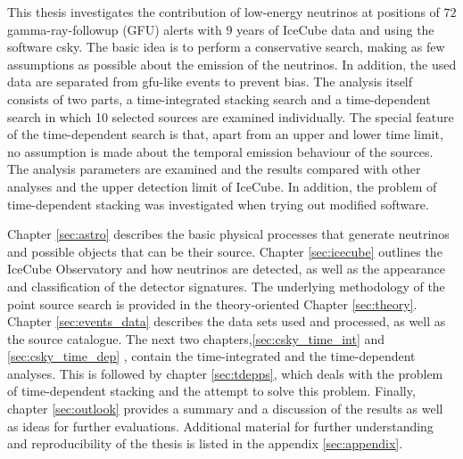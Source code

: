 This thesis investigates the contribution of low-energy neutrinos at positions of $\num{72}$ gamma-ray-followup (GFU) alerts with $\num{9}$ years of IceCube data and using the software csky.
The basic idea is to perform a conservative search, making as few assumptions as possible about the emission of the neutrinos.
In addition, the used data are separated from gfu-like events to prevent bias.
The analysis itself consists of two parts, a time-integrated stacking search and a time-dependent search in which 10 selected sources are examined individually.
The special feature of the time-dependent search is that, apart from an upper and lower time limit, no assumption is made about the temporal emission behaviour of the sources.
The analysis parameters are examined and the results compared with other analyses and the upper detection limit of IceCube.
In addition, the problem of time-dependent stacking was investigated when trying out modified software.

Chapter \ref{sec:astro} describes the basic physical processes that generate neutrinos and possible objects that can be their source.
Chapter \ref{sec:icecube} outlines the IceCube Observatory and how neutrinos are detected, as well as the appearance and classification of the detector signatures.
The underlying methodology of the point source search is provided in the theory-oriented Chapter \ref{sec:theory}.
Chapter \ref{sec:events_data} describes the data sets used and processed, as well as the source catalogue.
The next two chapters,\ref{sec:csky_time_int} and \ref{sec:csky_time_dep} , contain the time-integrated and the time-dependent analyses.
This is followed by chapter \ref{sec:tdepps}, which deals with the problem of time-dependent stacking and the attempt to solve this problem.
Finally, chapter \ref{sec:outlook} provides a summary and a discussion of the results as well as ideas for further evaluations.
Additional material for further understanding and reproducibility of the thesis is listed in the appendix \ref{sec:appendix}.
